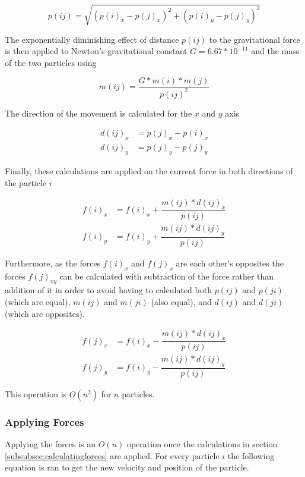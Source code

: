 \documentclass[titlepage,a4paper,12pt]{article}
\begin{document}
\begin{equation}
p(ij) = \sqrt{(p(i)_x - p(j)_x)^2 + (p(i)_y - p(j)_y)^2}
\end{equation}

The exponentially diminishing effect of distance $p(ij)$ to the gravitational
force is then applied to Newton's gravitational constant $G = 6.67*10^{-11}$ and
the mass of the two particles using

\begin{equation}
m(ij) = \dfrac{G*m(i)*m(j)}{p(ij)^2}
\end{equation}

The direction of the movement is calculated for the $x$ and $y$ axis 

\begin{align}
d(ij)_x &= p(j)_x - p(i)_x\\
d(ij)_y &= p(j)_y - p(j)_y
\end{align}

Finally, these calculations are applied on the current force in both directions
of the particle $i$

\begin{align}
f(i)_x &= f(i)_x + \dfrac{m(ij) * d(ij)_x}{p(ij)}\\
f(i)_y &= f(i)_y + \dfrac{m(ij) * d(ij)_y}{p(ij)}
\end{align}

Furthermore, as the forces $f(i)_x$ and $f(j)_x$ are each other's opposites
the forces $f(j)_{xy}$ can be calculated with subtraction of the force rather
than addition of it in order to avoid having to calculated both $p(ij)$ and
$p(ji)$ (which are equal), $m(ij)$ and $m(ji)$ (also equal), and $d(ij)$ and
$d(ji)$ (which are opposites).

\begin{align}
f(j)_x &= f(i)_x - \dfrac{m(ij) * d(ij)_x}{p(ij)}\\
f(j)_y &= f(i)_y - \dfrac{m(ij) * d(ij)_y}{p(ij)}
\end{align}

This operation is $O(n^2)$ for $n$ particles.

\subsubsection{Applying Forces}

Applying the forces is an $O(n)$ operation once the calculations in section
\ref{subsubsec:calculatingforces} are applied. For every particle $i$ the
following equation is ran to get the new velocity and position of the particle.
\end{document}
